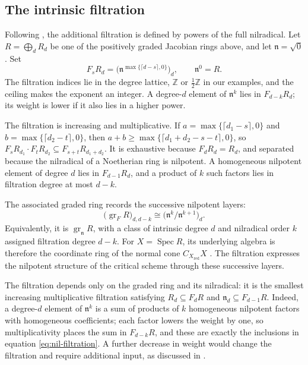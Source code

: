 \documentclass[10pt,reqno]{amsart}
\numberwithin{equation}{section}
\theoremstyle{plain}
\theoremstyle{definition}
\begin{document}
\subsection{The intrinsic filtration}\label{sec:filtration}

Following \cite{Kang:2026ney}, the additional filtration is defined by powers of the full nilradical. Let $R=\bigoplus_dR_d$ be one of the positively graded Jacobian rings above, and let $\mathfrak{n}=\sqrt0$. Set
\begin{equation}\label{eq:nil-filtration}
F_sR_d=\big(\mathfrak{n}^{\max\{\lceil d-s\rceil,0\}}\big)_d,\qquad \mathfrak{n}^0=R .
\end{equation}
The filtration indices lie in the degree lattice, $\mathbb{Z}$ or $\tfrac12\mathbb{Z}$ in our examples, and the ceiling makes the exponent an integer. A degree-$d$ element of $\mathfrak{n}^k$ lies in $F_{d-k}R_d$; its weight is lower if it also lies in a higher power.

The filtration is increasing and multiplicative. If $a=\max\{\lceil d_1-s\rceil,0\}$ and $b=\max\{\lceil d_2-t\rceil,0\}$, then $a+b\ge\max\{\lceil d_1+d_2-s-t\rceil,0\}$, so $F_sR_{d_1}\cdot F_tR_{d_2}\subseteq F_{s+t}R_{d_1+d_2}$. It is exhaustive because $F_dR_d=R_d$, and separated because the nilradical of a Noetherian ring is nilpotent. A homogeneous nilpotent element of degree $d$ lies in $F_{d-1}R_d$, and a product of $k$ such factors lies in filtration degree at most $d-k$.

The associated graded ring records the successive nilpotent layers:
\begin{equation*}
    \bigl(\operatorname{gr}_F R\bigr)_{d,d-k}\cong\bigl(\mathfrak n^k/\mathfrak n^{k+1}\bigr)_d .
\end{equation*}
Equivalently, it is $\operatorname{gr}_{\mathfrak n}R$, with a class of intrinsic degree $d$ and nilradical order $k$ assigned filtration degree $d-k$. For $X=\operatorname{Spec}R$, its underlying algebra is therefore the coordinate ring of the normal cone $C_{X_{\mathrm{red}}}X$ \cite[Tag~062Z, Definition~31.20.5]{stacks-project}. The filtration expresses the nilpotent structure of the critical scheme through these successive layers.

The filtration depends only on the graded ring and its nilradical: it is the smallest increasing multiplicative filtration satisfying $R_d\subseteq F_dR$ and $\mathfrak{n}_d\subseteq F_{d-1}R$. Indeed, a degree-$d$ element of $\mathfrak{n}^k$ is a sum of products of $k$ homogeneous nilpotent factors with homogeneous coefficients; each factor lowers the weight by one, so multiplicativity places the sum in $F_{d-k}R$, and these are exactly the inclusions in equation \eqref{eq:nil-filtration}. A further decrease in weight would change the filtration and require additional input, as discussed in \cite{Kang:2026ney}.
\end{document}
